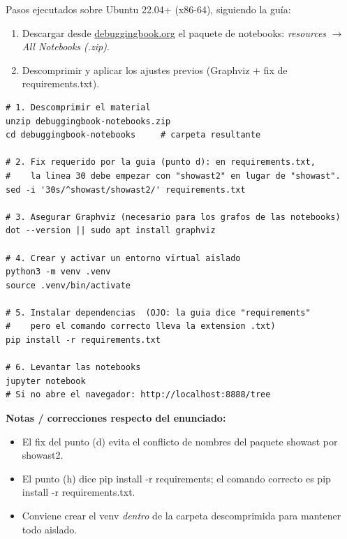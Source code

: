 \documentclass[11pt,a4paper]{article}
\newcommand{\code}[1]{\colorbox{codebg}{\ttfamily\small #1}}
\begin{document}
Pasos ejecutados sobre Ubuntu 22.04+ (x86-64), siguiendo la guía:

\begin{enumerate}[leftmargin=1.6em, itemsep=3pt]
  \item Descargar desde \href{https://www.debuggingbook.org/}{debuggingbook.org} el paquete de
        notebooks: \emph{resources} $\rightarrow$ \emph{All Notebooks (.zip)}.
  \item Descomprimir y aplicar los ajustes previos (Graphviz + fix de \code{requirements.txt}).
\end{enumerate}

\begin{lstlisting}[style=sh]
# 1. Descomprimir el material
unzip debuggingbook-notebooks.zip
cd debuggingbook-notebooks     # carpeta resultante

# 2. Fix requerido por la guia (punto d): en requirements.txt,
#    la linea 30 debe empezar con "showast2" en lugar de "showast".
sed -i '30s/^showast/showast2/' requirements.txt

# 3. Asegurar Graphviz (necesario para los grafos de las notebooks)
dot --version || sudo apt install graphviz

# 4. Crear y activar un entorno virtual aislado
python3 -m venv .venv
source .venv/bin/activate

# 5. Instalar dependencias  (OJO: la guia dice "requirements"
#    pero el comando correcto lleva la extension .txt)
pip install -r requirements.txt

# 6. Levantar las notebooks
jupyter notebook
# Si no abre el navegador: http://localhost:8888/tree
\end{lstlisting}

\begin{answer}\small
\textbf{Notas / correcciones respecto del enunciado:}
\begin{itemize}[leftmargin=1.3em, itemsep=1pt, topsep=2pt]
  \item El fix del punto (d) evita el conflicto de nombres del paquete \code{showast} por \code{showast2}.
  \item El punto (h) dice \code{pip install -r requirements}; el comando correcto es
        \code{pip install -r requirements.txt}.
  \item Conviene crear el \code{venv} \emph{dentro} de la carpeta descomprimida para mantener todo aislado.
\end{itemize}
\end{answer}

\end{document}
